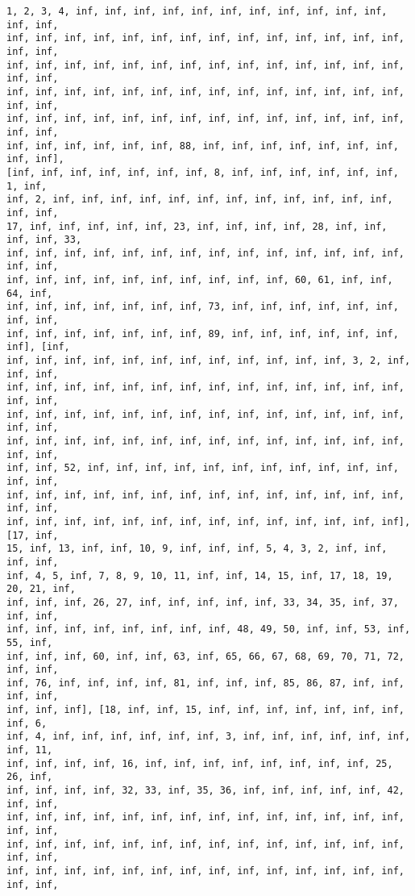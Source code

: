 \documentclass[11pt]{article}
\begin{document}
\begin{Verbatim}[commandchars=\\\{\}]
1, 2, 3, 4, inf, inf, inf, inf, inf, inf, inf, inf, inf, inf, inf, inf, inf,
inf, inf, inf, inf, inf, inf, inf, inf, inf, inf, inf, inf, inf, inf, inf, inf,
inf, inf, inf, inf, inf, inf, inf, inf, inf, inf, inf, inf, inf, inf, inf, inf,
inf, inf, inf, inf, inf, inf, inf, inf, inf, inf, inf, inf, inf, inf, inf, inf,
inf, inf, inf, inf, inf, inf, inf, inf, inf, inf, inf, inf, inf, inf, inf, inf,
inf, inf, inf, inf, inf, inf, 88, inf, inf, inf, inf, inf, inf, inf, inf, inf],
[inf, inf, inf, inf, inf, inf, inf, 8, inf, inf, inf, inf, inf, inf, 1, inf,
inf, 2, inf, inf, inf, inf, inf, inf, inf, inf, inf, inf, inf, inf, inf, inf,
17, inf, inf, inf, inf, inf, 23, inf, inf, inf, inf, 28, inf, inf, inf, inf, 33,
inf, inf, inf, inf, inf, inf, inf, inf, inf, inf, inf, inf, inf, inf, inf, inf,
inf, inf, inf, inf, inf, inf, inf, inf, inf, inf, 60, 61, inf, inf, 64, inf,
inf, inf, inf, inf, inf, inf, inf, 73, inf, inf, inf, inf, inf, inf, inf, inf,
inf, inf, inf, inf, inf, inf, inf, 89, inf, inf, inf, inf, inf, inf, inf], [inf,
inf, inf, inf, inf, inf, inf, inf, inf, inf, inf, inf, inf, 3, 2, inf, inf, inf,
inf, inf, inf, inf, inf, inf, inf, inf, inf, inf, inf, inf, inf, inf, inf, inf,
inf, inf, inf, inf, inf, inf, inf, inf, inf, inf, inf, inf, inf, inf, inf, inf,
inf, inf, inf, inf, inf, inf, inf, inf, inf, inf, inf, inf, inf, inf, inf, inf,
inf, inf, 52, inf, inf, inf, inf, inf, inf, inf, inf, inf, inf, inf, inf, inf,
inf, inf, inf, inf, inf, inf, inf, inf, inf, inf, inf, inf, inf, inf, inf, inf,
inf, inf, inf, inf, inf, inf, inf, inf, inf, inf, inf, inf, inf, inf], [17, inf,
15, inf, 13, inf, inf, 10, 9, inf, inf, inf, 5, 4, 3, 2, inf, inf, inf, inf,
inf, 4, 5, inf, 7, 8, 9, 10, 11, inf, inf, 14, 15, inf, 17, 18, 19, 20, 21, inf,
inf, inf, inf, 26, 27, inf, inf, inf, inf, inf, 33, 34, 35, inf, 37, inf, inf,
inf, inf, inf, inf, inf, inf, inf, inf, 48, 49, 50, inf, inf, 53, inf, 55, inf,
inf, inf, inf, 60, inf, inf, 63, inf, 65, 66, 67, 68, 69, 70, 71, 72, inf, inf,
inf, 76, inf, inf, inf, inf, 81, inf, inf, inf, 85, 86, 87, inf, inf, inf, inf,
inf, inf, inf], [18, inf, inf, 15, inf, inf, inf, inf, inf, inf, inf, inf, 6,
inf, 4, inf, inf, inf, inf, inf, inf, 3, inf, inf, inf, inf, inf, inf, inf, 11,
inf, inf, inf, inf, 16, inf, inf, inf, inf, inf, inf, inf, inf, 25, 26, inf,
inf, inf, inf, inf, 32, 33, inf, 35, 36, inf, inf, inf, inf, inf, 42, inf, inf,
inf, inf, inf, inf, inf, inf, inf, inf, inf, inf, inf, inf, inf, inf, inf, inf,
inf, inf, inf, inf, inf, inf, inf, inf, inf, inf, inf, inf, inf, inf, inf, inf,
inf, inf, inf, inf, inf, inf, inf, inf, inf, inf, inf, inf, inf, inf, inf, inf,

\end{Verbatim}
\end{document}

